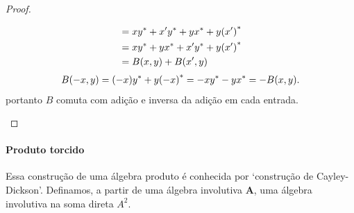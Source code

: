 \begin{proof}
\begin{enumerate}
\begin{align*}
			&= x{y}^* + x'{y}^* + y{x}^* + y{(x')}^* \\
			&= x{y}^* + y{x}^* + x'{y}^* + y{(x')}^* \\
			&= B(x,y) + B(x',y)
		\end{align*}
		\begin{align*}
		B(-x,y) = (-x){y}^* + y{(-x)}^* = -x{y}^* - y{x}^* = -B(x,y).
		\end{align*}
	portanto $B$ comuta com adição e inversa da adição em cada entrada.
	\end{enumerate}
\end{proof}

\paragraph{Produto torcido}

Essa construção de uma álgebra produto é conhecida por `construção de Cayley-Dickson'.
Definamos, a partir de uma álgebra involutiva $\bm A$, uma álgebra involutiva na soma direta $A^2$.

